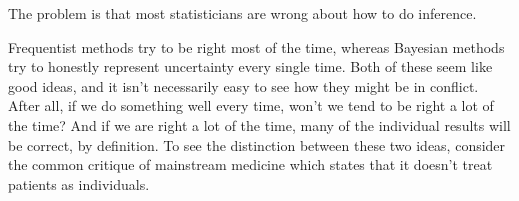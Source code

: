 \documentclass[a4paper, 12pt]{article}
\begin{document}
The problem is that most statisticians are wrong about how to do inference.

Frequentist methods try to be right most of the time, whereas Bayesian methods
try to honestly represent uncertainty every single time. Both of these seem
like good ideas, and it isn't necessarily easy to see how they might be in
conflict. After all, if we do something well every time, won't we tend to be
right a lot of the time? And if we are right a lot of the time, many of the
individual results will be correct, by definition.
To see the distinction between these two ideas,
consider the common critique of mainstream medicine which states that it
doesn't treat patients as individuals.
\end{document}
